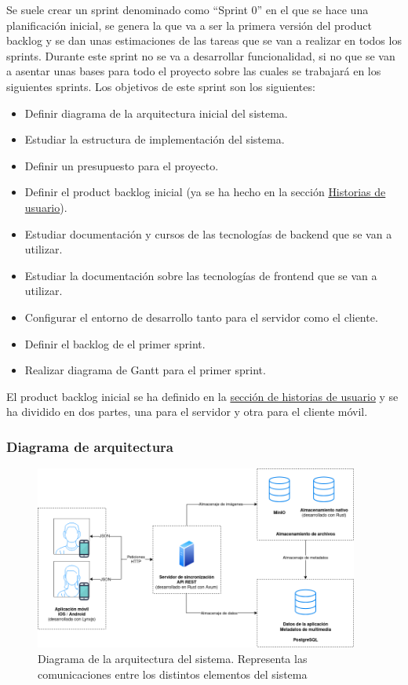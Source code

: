 Se suele crear un sprint denominado como ``Sprint 0'' en el que se hace una planificación inicial, se genera la que va a ser la primera versión del product backlog y se dan unas estimaciones de las tareas que se van a realizar en todos los sprints.
Durante este sprint no se va a desarrollar funcionalidad, si no que se van a asentar unas bases para todo el proyecto sobre las cuales se trabajará en los siguientes sprints.
Los objetivos de este sprint son los siguientes:

\begin{itemize}
    \item Definir diagrama de la arquitectura inicial del sistema.
    \item Estudiar la estructura de implementación del sistema.
    \item Definir un presupuesto para el proyecto.
    \item Definir el product backlog inicial (ya se ha hecho en la sección \hyperref[sec:historias-de-usuario]{Historias de usuario}).
    \item Estudiar documentación y cursos de las tecnologías de backend que se van a utilizar.
    \item Estudiar la documentación sobre las tecnologías de frontend que se van a utilizar.
    \item Configurar el entorno de desarrollo tanto para el servidor como el cliente.
    \item Definir el backlog de el primer sprint.
    \item Realizar diagrama de Gantt para el primer sprint.
\end{itemize}

El product backlog inicial se ha definido en la \hyperref[sec:historias-de-usuario]{sección de historias de usuario} y se ha dividido en dos partes, una para el servidor y otra para el cliente móvil.

\subsubsection{Diagrama de arquitectura}
\begin{figure}[H]
    \begin{center}
        \includegraphics[width=0.95\textwidth]{images/diagrama-arquitectura.png}
    \end{center}
    \caption{Diagrama de la arquitectura del sistema. Representa las comunicaciones entre los distintos elementos del sistema}\label{fig:diagrama-arquitectura}
\end{figure}

